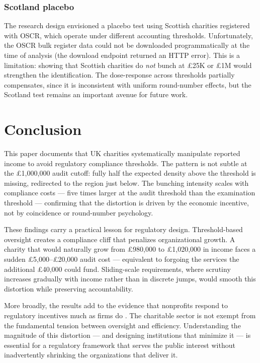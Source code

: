 \documentclass[12pt]{article}
\begin{document}
\subsubsection*{Scotland placebo} The research design envisioned a placebo test using Scottish charities registered with OSCR, which operate under different accounting thresholds. Unfortunately, the OSCR bulk register data could not be downloaded programmatically at the time of analysis (the download endpoint returned an HTTP error). This is a limitation: showing that Scottish charities do \emph{not} bunch at \pounds25K or \pounds1M would strengthen the identification. The dose-response across thresholds partially compensates, since it is inconsistent with uniform round-number effects, but the Scotland test remains an important avenue for future work.




\section{Conclusion}

This paper documents that UK charities systematically manipulate reported income to avoid regulatory compliance thresholds. The pattern is not subtle at the \pounds1,000,000 audit cutoff: fully half the expected density above the threshold is missing, redirected to the region just below. The bunching intensity scales with compliance costs --- five times larger at the audit threshold than the examination threshold --- confirming that the distortion is driven by the economic incentive, not by coincidence or round-number psychology.

These findings carry a practical lesson for regulatory design. Threshold-based oversight creates a compliance cliff that penalizes organizational growth. A charity that would naturally grow from \pounds980,000 to \pounds1,020,000 in income faces a sudden \pounds5,000--\pounds20,000 audit cost --- equivalent to forgoing the services the additional \pounds40,000 could fund. Sliding-scale requirements, where scrutiny increases gradually with income rather than in discrete jumps, would smooth this distortion while preserving accountability.

More broadly, the results add to the evidence that nonprofits respond to regulatory incentives much as firms do \citep{garicano2016,dharmapala2011}. The charitable sector is not exempt from the fundamental tension between oversight and efficiency. Understanding the magnitude of this distortion --- and designing institutions that minimize it --- is essential for a regulatory framework that serves the public interest without inadvertently shrinking the organizations that deliver it.
\end{document}
